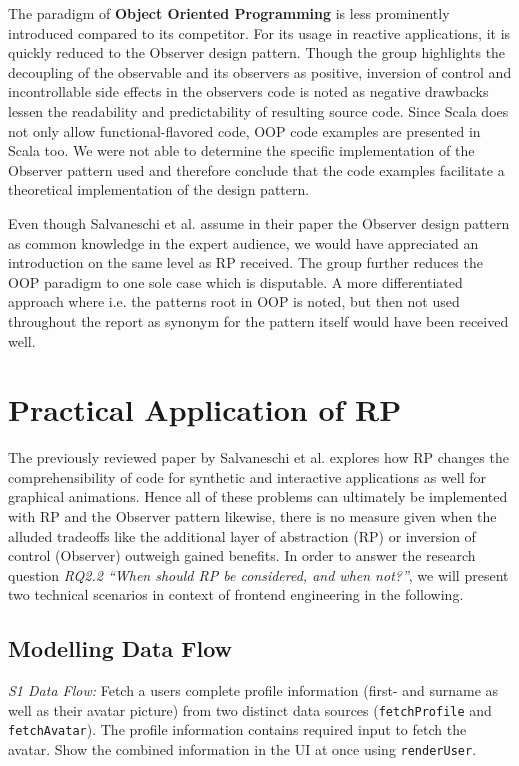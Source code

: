 \documentclass[12pt,a4paper]{article}
\begin{document}
The paradigm of \textbf{Object Oriented Programming} is less prominently introduced compared to its competitor. For its usage in reactive applications, it is quickly reduced to the Observer design pattern. Though the group highlights the decoupling of the observable and its observers as positive, inversion of control and incontrollable side effects in the observers code is noted as negative drawbacks lessen the readability and predictability of resulting source code. Since Scala does not only allow functional-flavored code, OOP code examples are presented in Scala too. We were not able to determine the specific implementation of the Observer pattern used and therefore conclude that the code examples facilitate a theoretical implementation of the design pattern.

Even though Salvaneschi et al. assume in their paper the Observer design pattern as common knowledge in the expert audience, we would have appreciated an introduction on the same level as RP received. The group further reduces the OOP paradigm to one sole case which is disputable. A more differentiated approach where i.e. the patterns root in OOP is noted, but then not used throughout the report as synonym for the pattern itself would have been received well.

\section{Practical Application of RP}
\label{sec:practical-application}

The previously reviewed paper by Salvaneschi et al. explores how RP changes the comprehensibility of code for synthetic and interactive applications as well for graphical animations. Hence all of these problems can ultimately be implemented with RP and the Observer pattern likewise, there is no measure given when the alluded tradeoffs like the additional layer of abstraction (RP) or inversion of control (Observer) outweigh gained benefits. In order to answer the research question \emph{RQ2.2 ``When should RP be considered, and when not?''}, we will present two technical scenarios in context of frontend engineering in the following.

\subsection{Modelling Data Flow}

\begin{framed}
	\noindent\emph{S1 Data Flow:} Fetch a users complete profile information (first- and surname as well as their avatar picture) from two distinct data sources (\texttt{fetchProfile} and \texttt{fetchAvatar}). The profile information contains required input to fetch the avatar. Show the combined information in the UI at once using \texttt{renderUser}.
\end{framed}
\end{document}
